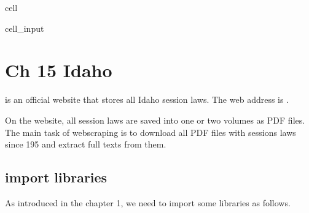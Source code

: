 \documentclass[letterpaper,10pt,english]{jupyterBook}
\begin{document}
\begin{sphinxuseclass}{cell}
\begin{sphinxVerbatimInput}
\begin{sphinxuseclass}{cell_input}
\begin{sphinxVerbatim}[commandchars=\\\{\}]
\PYG{p}{[}\PYG{p}{]}
                             

\end{sphinxVerbatim}

\end{sphinxuseclass}\end{sphinxVerbatimInput}

\end{sphinxuseclass}
\sphinxstepscope


\chapter{Ch 15 Idaho}
\label{\detokenize{ch15:ch-15-idaho}}\label{\detokenize{ch15::doc}}
\sphinxAtStartPar
{} is an official website that stores all Idaho session laws. The web address is .

\sphinxAtStartPar
{}

\sphinxAtStartPar
On the website, all session laws are saved into one or two volumes as PDF files. The main task of webscraping is to download all PDF files with sessions laws since 195 and extract full texts from them.


\section{import libraries}
\label{\detokenize{ch15:import-libraries}}
\sphinxAtStartPar
As introduced in the chapter 1, we need to import some libraries as follows.
\end{document}
